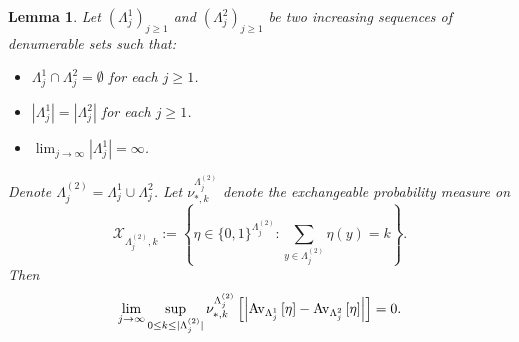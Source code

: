 \documentclass[11pt]{amsart}
\theoremstyle{plain}
\newtheorem{lemma}{Lemma}[section]
\theoremstyle{definition}
\theoremstyle{remark}
\begin{document}
\begin{lemma}
\label{lem:U2vanish}
Let $(\Lambda_j^1)_{j\geq 1}$ and $(\Lambda_j^2)_{j\geq 1}$ be two increasing sequences of denumerable sets such that:
\begin{itemize}
\item $\Lambda_j^1 \cap \Lambda_j^2 =\emptyset$ for each $j\geq 1$.
\item $|\Lambda_j^1| = |\Lambda_j^2|$ for each $j\geq 1$.
\item $\lim_{j\to\infty} |\Lambda_j^1| =\infty$.
\end{itemize}
Denote $\Lambda^{(2)}_j = \Lambda_j^1 \cup \Lambda_j^2$. Let $\nu^{\Lambda^{(2)}_j}_{*,k}$ denote the exchangeable probability measure on 
$$\mathcal{X}_{\Lambda^{(2)}_j,k}:=\left\{\eta\in \{0,1\}^{\Lambda^{(2)}_j} : \sum_{y\in \Lambda^{(2)}_j} \eta(y)=k\right\}.$$
 Then
\begin{align}
\label{eq:U2vanish}
\lim_{j\to\infty} \sup_{0\leq k\leq |\Lambda^{(2)}_j|} \nu^{\Lambda^{(2)}_j}_{*,k} \left[ \left|{{\rm Av}_{{\Lambda_j^1}}\left[{{\eta}}\right]} -{{\rm Av}_{{\Lambda_j^2}}\left[{{\eta}}\right]}\right|\right] =0.
\end{align}
\end{lemma}
\end{document}
